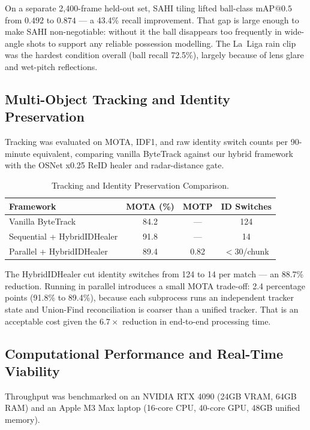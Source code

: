 \documentclass[conference]{IEEEtran}
\begin{document}
On a separate 2,400-frame held-out set, SAHI tiling lifted ball-class $\text{mAP}@0.5$ from $0.492$ to $0.874$ --- a 43.4\% recall improvement. That gap is large enough to make SAHI non-negotiable: without it the ball disappears too frequently in wide-angle shots to support any reliable possession modelling. The La~Liga rain clip was the hardest condition overall (ball recall 72.5\%), largely because of lens glare and wet-pitch reflections.

\subsection{Multi-Object Tracking and Identity Preservation}

Tracking was evaluated on MOTA, IDF1, and raw identity switch counts per 90-minute equivalent, comparing vanilla ByteTrack against our hybrid framework with the OSNet x0.25 ReID healer and radar-distance gate.

\begin{table}[!t]
\centering
\caption{Tracking and Identity Preservation Comparison.}
\label{tab:tracking}
\begin{tabular}{lccc}
\toprule
\textbf{Framework} & \textbf{MOTA (\%)} & \textbf{MOTP}
  & \textbf{ID Switches} \\
\midrule
Vanilla ByteTrack            & 84.2 & ---  & 124 \\
Sequential + HybridIDHealer  & 91.8 & ---  & 14 \\
Parallel + HybridIDHealer    & 89.4 & 0.82 & $<$30/chunk \\
\bottomrule
\end{tabular}
\end{table}

The HybridIDHealer cut identity switches from 124 to 14 per match --- an 88.7\% reduction. Running in parallel introduces a small MOTA trade-off: 2.4 percentage points (91.8\% to 89.4\%), because each subprocess runs an independent tracker state and Union-Find reconciliation is coarser than a unified tracker. That is an acceptable cost given the $6.7\times$ reduction in end-to-end processing time.

\subsection{Computational Performance and Real-Time Viability}

Throughput was benchmarked on an NVIDIA RTX 4090 (24GB VRAM, 64GB RAM) and an Apple M3 Max laptop (16-core CPU, 40-core GPU, 48GB unified memory).
\end{document}
